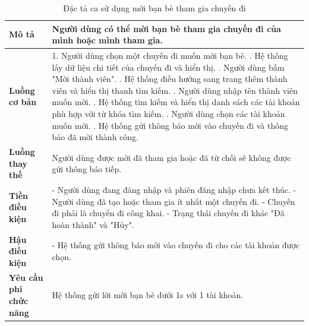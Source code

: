\begin{longtable}{| p{4cm} | p{\dimexpr\linewidth-4cm-4\tabcolsep} |} %
    \caption{Đặc tả ca sử dụng mời bạn bè tham gia chuyến đi} %
    \label{tab:uc_invite_friend_spec} \\ %

    \hline
    \textbf{Mô tả} & Người dùng có thể mời bạn bè tham gia chuyến đi của mình hoặc mình tham gia. \\
    \hline
    \endfirsthead %



    \hline %
    \endlastfoot

    \textbf{Luồng cơ bản} & 1. Người dùng chọn một chuyến đi muốn mời bạn bè. \newline
                           2. Hệ thống lấy dữ liệu chi tiết của chuyến đi và hiển thị. \newline
                           3. Người dùng bấm "Mời thành viên". \newline
                           4. Hệ thống điều hướng sang trang thêm thành viên và hiển thị thanh tìm kiếm. \newline
                           5. Người dùng nhập tên thành viên muốn mời. \newline
                           6. Hệ thống tìm kiếm và hiển thị danh sách các tài khoản phù hợp với từ khóa tìm kiếm. \newline
                           7. Người dùng chọn các tài khoản muốn mời. \newline
                           8. Hệ thống gửi thông báo mời vào chuyến đi và thông báo đã mời thành công. \\
    \hline
    \textbf{Luồng thay thế} & Người dùng được mời đã tham gia hoặc đã từ chối sẽ không được gửi thông báo tiếp. \\
    \hline
    \textbf{Tiền điều kiện} & - Người dùng đang đăng nhập và phiên đăng nhập chưa kết thúc.\newline
                           - Người dùng đã tạo hoặc tham gia ít nhất một chuyến đi. \newline
                           - Chuyến đi phải là chuyến đi công khai.\newline
                           - Trạng thái chuyến đi khác "Đã hoàn thành" và "Hủy". \\
    \hline
    \textbf{Hậu điều kiện} & - Hệ thống gửi thông báo mời vào chuyến đi cho các tài khoản được chọn. \\
    \hline
    \textbf{Yêu cầu phi chức năng} & Hệ thống gửi lời mời bạn bè dưới 1s với 1 tài khoản. \\

\end{longtable}
\vspace{0.8cm}

